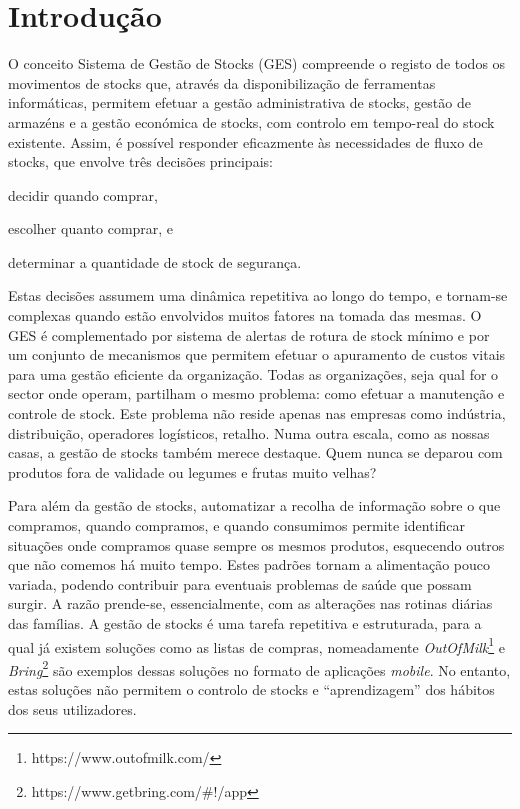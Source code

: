 %
%
\chapter{Introdução} \label{cap1}

O conceito Sistema de Gestão de Stocks (GES) compreende o registo de todos os movimentos de stocks que, através da disponibilização de ferramentas informáticas, permitem efetuar a gestão administrativa de stocks, gestão de armazéns e a gestão económica de stocks, com controlo em tempo-real do stock existente. Assim, é possível responder eficazmente às necessidades de fluxo de stocks, que envolve três decisões principais:
\begin{inparaenum}[i)]
\item decidir quando comprar,
\item escolher quanto comprar, e
\item determinar a quantidade de stock de segurança.
\end{inparaenum}
Estas decisões assumem uma dinâmica repetitiva ao longo do tempo, e tornam-se complexas quando estão envolvidos muitos fatores na tomada das mesmas.  
O GES é complementado por sistema de alertas de rotura de stock mínimo e por um conjunto de mecanismos que permitem efetuar o apuramento de custos vitais para uma gestão eficiente da organização. Todas as organizações, seja qual for o sector onde operam, partilham o mesmo problema: como efetuar a manutenção e controle de stock. Este problema não reside apenas nas empresas como indústria, distribuição, operadores logísticos, retalho. Numa outra escala, como as nossas casas, a gestão de stocks também merece destaque. Quem nunca se deparou com produtos fora de validade ou legumes e frutas muito velhas? 

Para além da gestão de stocks, automatizar a recolha de informação sobre o que compramos, quando compramos, e quando consumimos permite identificar situações onde compramos quase sempre os mesmos produtos, esquecendo outros que não comemos há muito tempo. Estes padrões tornam a alimentação pouco variada, podendo contribuir para eventuais problemas de saúde que possam surgir. A razão prende-se, essencialmente, com as alterações nas rotinas diárias das famílias. A gestão de stocks é uma tarefa repetitiva e estruturada, para a qual já existem soluções como as listas de compras, nomeadamente \textit{OutOfMilk}\footnote[1]{https://www.outofmilk.com/} e \textit{Bring}\footnote[2]{https://www.getbring.com/\#!/app} são exemplos dessas soluções no formato de aplicações \textit{mobile}. No entanto, estas soluções não permitem o controlo de stocks e ``aprendizagem'' dos hábitos dos seus utilizadores.

